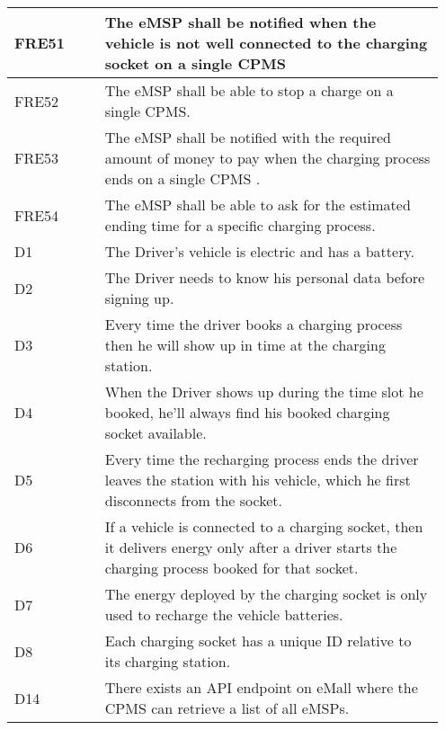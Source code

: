 {\begin{longtable}{|p{0.20\linewidth}p{0.75\linewidth} |}
    \hline
    \rowcolor{bluepoli!15} FRE51 & The eMSP shall be notified when the vehicle is not well connected to the charging socket on a single CPMS \\
    \hline
    \rowcolor{bluepoli!15} FRE52 & The eMSP shall be able to stop a charge on a single CPMS. \\
    \hline
    \rowcolor{bluepoli!15} FRE53 &  The eMSP shall be notified with the required amount of money to pay when the charging process ends on a single CPMS .\\
    \hline
    \rowcolor{bluepoli!15} FRE54 & The eMSP shall be able to ask for the estimated ending time for a specific charging process. \\
    \hline
    \rowcolor{bluepoli!5} D1 & The Driver's vehicle is electric and has a battery.\\
    \hline
    \rowcolor{bluepoli!5} D2 & The Driver needs to know his personal data before signing up.\\
    \hline
    \rowcolor{bluepoli!5} D3 & Every time the driver books a charging process then he will show up in time at the charging station.\\
    \hline
    \rowcolor{bluepoli!5} D4 & When the Driver shows up during the time slot he booked, he’ll always find his booked charging socket available.\\
    \hline
    \rowcolor{bluepoli!5} D5 & Every time the recharging process ends the driver leaves the station with his vehicle, which he first disconnects from the socket.\\
    \hline    
    \rowcolor{bluepoli!5} D6& If a vehicle is connected to a charging socket, then it delivers energy only after a driver starts the charging process booked for that socket.\\
    \hline
    \rowcolor{bluepoli!5} D7 & The energy deployed by the charging socket is only used to recharge the vehicle batteries.\\
    \hline 
    \rowcolor{bluepoli!5} D8 &
    Each charging socket has a unique ID relative to its charging station.\\
    \hline
    \rowcolor{bluepoli!5} D14 & There exists an API endpoint on eMall where the CPMS can retrieve a list of all eMSPs. \\
    \hline
\end{longtable}}
